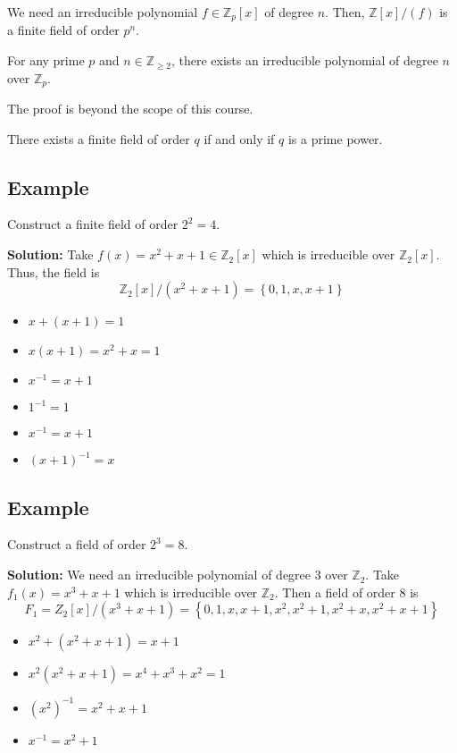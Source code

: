 We need an irreducible polynomial $ f\in\mathbb{Z}_p[x] $ of degree $ n $.
Then, $ \mathbb{Z}[x]/(f) $ is a finite field of order $ p^n $.

\begin{thmbox}
    \begin{theorem}
    For any prime $ p $ and $ n\in\mathbb{Z}_{\geqslant 2} $, there exists
    an irreducible polynomial of degree $ n $ over $ \mathbb{Z}_p $.
\end{theorem} \end{thmbox}
The proof is beyond the scope of this course.

\begin{thmbox}
    \begin{theorem}
    There exists a finite field of order $ q $ if and only if
    $ q $ is a prime power.
\end{theorem} \end{thmbox}

\begin{exbox}
    \subsection{Example}
    Construct a finite field of order $ 2^2=4 $.

    \textbf{Solution:} Take $ f(x)=x^2+x+1\in\mathbb{Z}_2[x] $
    which is irreducible over $ \mathbb{Z}_2[x] $. Thus, the field is
    \[ \mathbb{Z}_2[x]/(x^2+x+1)=\left\{ 0,1,x,x+1\right\} \]
    \begin{itemize}
        \item $ x+(x+1)=1 $
        \item $ x(x+1)=x^2+x=1 $
        \item $ x^{-1}=x+1 $
        \item $ 1^{-1}=1 $
        \item $ x^{-1}=x+1 $
        \item $ (x+1)^{-1}=x $
    \end{itemize}
\end{exbox}

\begin{exbox}
    \subsection{Example}
    Construct a field of order $ 2^3=8 $.

    \textbf{Solution:} We need an irreducible polynomial of degree $ 3 $
    over $ \mathbb{Z}_2 $. Take $ f_1(x)=x^3+x+1 $ which is
    irreducible over $ \mathbb{Z}_2 $. Then a field of order $ 8 $ is
    \[ F_1=Z_2[x]/(x^3+x+1)=\left\{ 0,1,x,x+1,x^2,x^2+1,x^2+x,x^2+x+1\right\} \]
    \begin{itemize}
        \item $ x^2+(x^2+x+1)=x+1 $
        \item $ x^2(x^2+x+1)=x^4+x^3+x^2=1 $
        \item $ (x^2)^{-1}=x^2+x+1 $
        \item $ x^{-1}=x^2+1 $
    \end{itemize}
\end{exbox}

